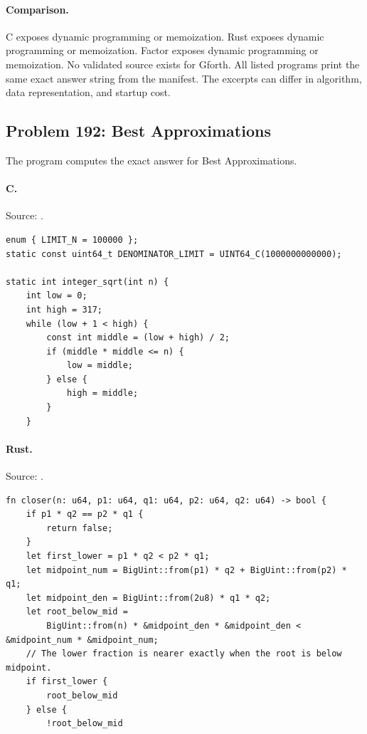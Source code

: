 \paragraph{Comparison.}
C exposes dynamic programming or memoization. Rust exposes dynamic programming or memoization. Factor exposes dynamic programming or memoization.
No validated source exists for Gforth.
All listed programs print the same exact answer string from the manifest. The excerpts can differ in algorithm, data representation, and startup cost.

\subsection{Problem 192: Best Approximations}
\label{walkthrough:p192}
The program computes the exact answer for Best Approximations.

\paragraph{C.} Source: .
\begin{lstlisting}
enum { LIMIT_N = 100000 };
static const uint64_t DENOMINATOR_LIMIT = UINT64_C(1000000000000);

static int integer_sqrt(int n) {
    int low = 0;
    int high = 317;
    while (low + 1 < high) {
        const int middle = (low + high) / 2;
        if (middle * middle <= n) {
            low = middle;
        } else {
            high = middle;
        }
    }
\end{lstlisting}

\paragraph{Rust.} Source: .
\begin{lstlisting}
fn closer(n: u64, p1: u64, q1: u64, p2: u64, q2: u64) -> bool {
    if p1 * q2 == p2 * q1 {
        return false;
    }
    let first_lower = p1 * q2 < p2 * q1;
    let midpoint_num = BigUint::from(p1) * q2 + BigUint::from(p2) * q1;
    let midpoint_den = BigUint::from(2u8) * q1 * q2;
    let root_below_mid =
        BigUint::from(n) * &midpoint_den * &midpoint_den < &midpoint_num * &midpoint_num;
    // The lower fraction is nearer exactly when the root is below midpoint.
    if first_lower {
        root_below_mid
    } else {
        !root_below_mid
\end{lstlisting}

